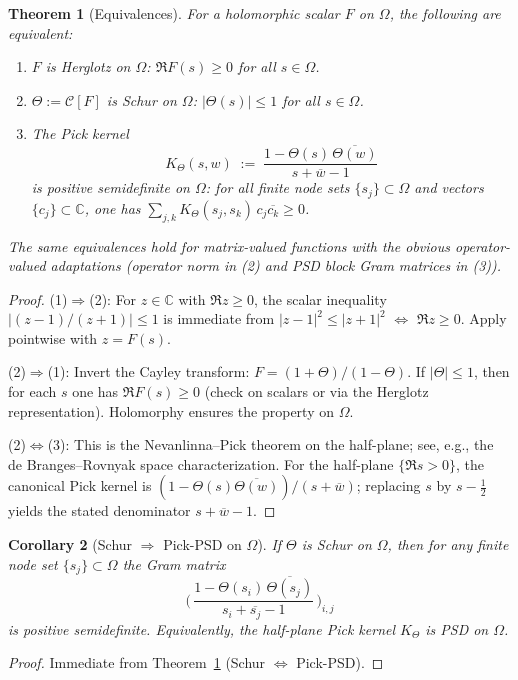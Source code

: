\documentclass[11pt]{article}
\newtheorem{theorem}{Theorem}
\newtheorem{corollary}[theorem]{Corollary}
\theoremstyle{remark}
\newcommand{\C}{\mathbb{C}}
\begin{document}
\begin{theorem}[Equivalences]\label{thm:equivalences}
For a holomorphic scalar \(F\) on \(\Omega\), the following are equivalent:
\begin{enumerate}
 \item \(F\) is Herglotz on \(\Omega\): \(\Re F(s)\ge 0\) for all \(s\in\Omega\).
 \item \(\Theta:=\mathcal C[F]\) is Schur on \(\Omega\): \(|\Theta(s)|\le 1\) for all \(s\in\Omega\).
 \item The Pick kernel
 \[
  K_\Theta(s,w)\;:=\;\frac{1-\Theta(s)\,\overline{\Theta(w)}}{s+\overline{w}-1}
 \]
 is positive semidefinite on \(\Omega\): for all finite node sets \(\{s_j\}\subset\Omega\) and vectors \(\{c_j\}\subset\C\), one has \(\sum_{j,k} K_\Theta(s_j,s_k)\,c_j\overline{c_k}\ge 0\).
\end{enumerate}
The same equivalences hold for matrix-valued functions with the obvious operator-valued adaptations (operator norm in (2) and PSD block Gram matrices in (3)).
\end{theorem}
\begin{proof}
(1)\(\Rightarrow\)(2): For \(z\in\C\) with \(\Re z\ge 0\), the scalar inequality \(|(z-1)/(z+1)|\le 1\) is immediate from \(|z-1|^2\le |z+1|^2\) \(\Leftrightarrow\) \(\Re z\ge 0\). Apply pointwise with \(z=F(s)\).

(2)\(\Rightarrow\)(1): Invert the Cayley transform: \(F=(1+\Theta)/(1-\Theta)\). If \(|\Theta|\le 1\), then for each \(s\) one has \(\Re F(s)\ge 0\) (check on scalars or via the Herglotz representation). Holomorphy ensures the property on \(\Omega\).

(2)\(\Leftrightarrow\)(3): This is the Nevanlinna--Pick theorem on the half-plane; see, e.g., the de Branges--Rovnyak space characterization. For the half-plane \(\{\Re s>0\}\), the canonical Pick kernel is \((1-\Theta(s)\overline{\Theta(w)})/(s+\overline{w})\); replacing \(s\) by \(s-\tfrac12\) yields the stated denominator \(s+\overline{w}-1\).
\end{proof}

\begin{corollary}[Schur \(\Rightarrow\) Pick-PSD on \(\Omega\)]\label{cor:schur-pick-psd}
If \(\Theta\) is Schur on \(\Omega\), then for any finite node set \(\{s_j\}\subset\Omega\) the Gram matrix
\[
\Big(\,\frac{1-\Theta(s_i)\,\overline{\Theta(s_j)}}{\,s_i+\overline{s_j}-1\,}\,\Big)_{i,j}
\]
is positive semidefinite. Equivalently, the half-plane Pick kernel \(K_\Theta\) is PSD on \(\Omega\).
\end{corollary}
\begin{proof}
Immediate from Theorem~\ref{thm:equivalences} (Schur \(\Leftrightarrow\) Pick-PSD).
\end{proof}
\end{document}

